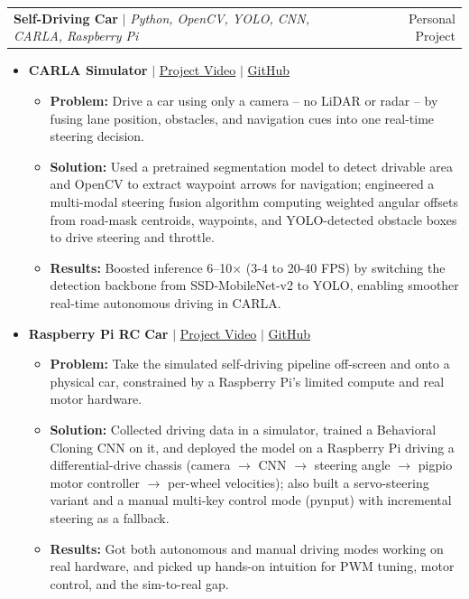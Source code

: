 \documentclass[letterpaper,11pt]{article}
\makeatletter
\newcommand{\resumeItem}[1]{
  \item\small{#1}
}
\newcommand{\resumeProjectHeading}[2]{
  \item
    \begin{tabular*}{1.0\textwidth}{l@{\extracolsep{\fill}}r}
      \small#1 & #2 \\
    \end{tabular*}\vspace{-2.5pt}
}
\newcommand{\resumeItemListStart}{\begin{itemize}[leftmargin=0.15in, itemsep=0.2pt, topsep=1pt, parsep=0pt, partopsep=0pt]}
\newcommand{\resumeItemListEnd}{\end{itemize}\vspace{-1pt}}
\makeatother
\begin{document}
      \resumeProjectHeading
          {\textbf{Self-Driving Car} $|$ \emph{Python, OpenCV, YOLO, CNN, CARLA, Raspberry Pi}}{Personal Project}
          \resumeItemListStart
            \vspace{2pt}\item[] \small{\textbf{CARLA Simulator} $|$ \href{https://user-images.githubusercontent.com/63576756/135388850-3d1241d7-1122-446b-b17e-6589d3da7ca6.mp4}{Project Video} $|$ \href{https://github.com/Space-Fighter/Self-driving-Car-Project}{GitHub}}
              \begin{itemize}[leftmargin=0.2in, itemsep=0.5pt, topsep=1pt]
                \resumeItem{\textbf{Problem:} Drive a car using only a camera -- no LiDAR or radar -- by fusing lane position, obstacles, and navigation cues into one real-time steering decision.}
                \resumeItem{\textbf{Solution:} Used a pretrained segmentation model to detect drivable area and OpenCV to extract waypoint arrows for navigation; engineered a multi-modal steering fusion algorithm computing weighted angular offsets from road-mask centroids, waypoints, and YOLO-detected obstacle boxes to drive steering and throttle.}
                \resumeItem{\textbf{Results:} Boosted inference 6--10$\times$ (3-4 to 20-40 FPS) by switching the detection backbone from SSD-MobileNet-v2 to YOLO, enabling smoother real-time autonomous driving in CARLA.}
              \end{itemize}
            \vspace{3pt}\item[] \small{\textbf{Raspberry Pi RC Car} $|$ \href{https://github.com/user-attachments/assets/c8a6b5bb-3bdb-41a5-be04-1f1975059fe4}{Project Video} $|$ \href{https://github.com/Space-Fighter/Raspberry-Pi-Self-Driving-Car-Project}{GitHub}}
              \begin{itemize}[leftmargin=0.2in, itemsep=0.5pt, topsep=1pt]
                \resumeItem{\textbf{Problem:} Take the simulated self-driving pipeline off-screen and onto a physical car, constrained by a Raspberry Pi's limited compute and real motor hardware.}
                \resumeItem{\textbf{Solution:} Collected driving data in a simulator, trained a Behavioral Cloning CNN on it, and deployed the model on a Raspberry Pi driving a differential-drive chassis (camera $\rightarrow$ CNN $\rightarrow$ steering angle $\rightarrow$ pigpio motor controller $\rightarrow$ per-wheel velocities); also built a servo-steering variant and a manual multi-key control mode (pynput) with incremental steering as a fallback.}
                \resumeItem{\textbf{Results:} Got both autonomous and manual driving modes working on real hardware, and picked up hands-on intuition for PWM tuning, motor control, and the sim-to-real gap.}
              \end{itemize}
          \resumeItemListEnd
\end{document}
